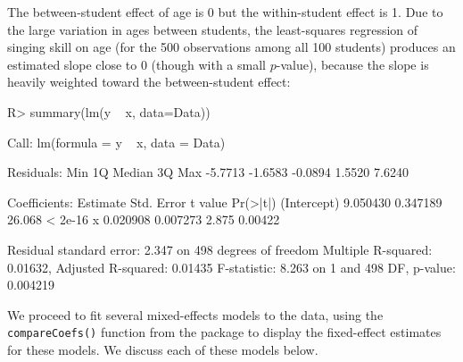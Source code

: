 \documentclass[
]{jss}
\begin{document}
\begin{CodeChunk}
\begin{figure}
st 10 of 100 students, and (b)--(e) predictions from several mixed models fit to the data}\label{fig:plot1}
\end{figure}
\end{CodeChunk}

The between-student effect of age is 0 but the within-student effect is
1. Due to the large variation in ages between students, the
least-squares regression of singing skill on age (for the 500
observations among all 100 students) produces an estimated slope close
to 0 (though with a small \(p\)-value), because the slope is heavily
weighted toward the between-student effect:

\begin{CodeChunk}
\begin{CodeInput}
R> summary(lm(y ~ x, data=Data))
\end{CodeInput}
\begin{CodeOutput}

Call:
lm(formula = y ~ x, data = Data)

Residuals:
    Min      1Q  Median      3Q     Max 
-5.7713 -1.6583 -0.0894  1.5520  7.6240 

Coefficients:
            Estimate Std. Error t value Pr(>|t|)
(Intercept) 9.050430   0.347189  26.068  < 2e-16
x           0.020908   0.007273   2.875  0.00422

Residual standard error: 2.347 on 498 degrees of freedom
Multiple R-squared:  0.01632,   Adjusted R-squared:  0.01435 
F-statistic: 8.263 on 1 and 498 DF,  p-value: 0.004219
\end{CodeOutput}
\end{CodeChunk}

We proceed to fit several mixed-effects models to the data, using the
\texttt{compareCoefs()} function from the  package
\citep{FoxWeisberg:2019} to display the fixed-effect estimates for these
models. We discuss each of these models below.
\end{document}
